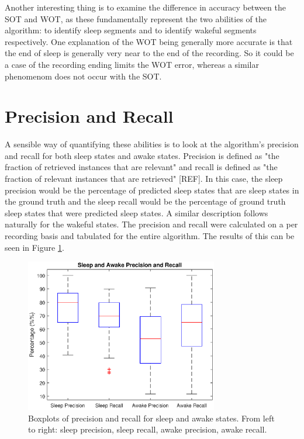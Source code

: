             Another interesting thing is to examine the difference in accuracy between the SOT and WOT, as these fundamentally represent the two abilities of the algorithm: to identify sleep segments and to identify wakeful segments respectively. One explanation of the WOT being generally more accurate is that the end of sleep is generally very near to the end of the recording. So it could be a case of the recording ending limits the WOT error, whereas a similar phenomenom does not occur with the SOT.

        \section{Precision and Recall}

            A sensible way of quantifying these abilities is to look at the algorithm's precision and recall for both sleep states and awake states. Precision is defined as "the fraction of retrieved instances that are relevant" and recall is defined as "the fraction of relevant instances that are retrieved" [REF]. In this case, the sleep precision would be the percentage of predicted sleep states that are sleep states in the ground truth and the sleep recall would be the percentage of ground truth sleep states that were predicted sleep states. A similar description follows naturally for the wakeful states. The precision and recall were calculated on a per recording basis and tabulated for the entire algorithm. The results of this can be seen in Figure \ref{img_prec_recall}.

            \begin{figure}[h]
                \includegraphics[width=0.75\textwidth]{Images/prec_recall.eps}
                \centering
                \caption{Boxplots of precision and recall for sleep and awake states. From left to right: sleep precision, sleep recall, awake precision, awake recall.}
                \label{img_prec_recall}
            \end{figure}

